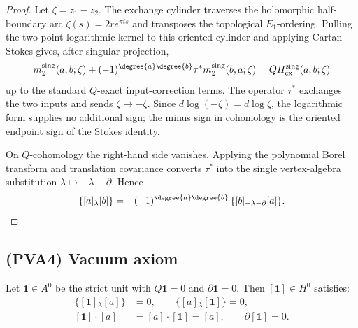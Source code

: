 \begin{proof}
Let \(\zeta=z_1-z_2\).  The exchange cylinder traverses the
holomorphic half-boundary arc \(\zeta(s)=2r e^{\pi i s}\) and
transposes the topological \(E_1\)-ordering.  Pulling the two-point
logarithmic kernel to this oriented cylinder and applying Cartan--Stokes
gives, after singular projection,
\[
m_2^{\mathrm{sing}}(a,b;\zeta)
+(-1)^{\degree{a}\degree{b}}\tau^\ast
m_2^{\mathrm{sing}}(b,a;\zeta)
=QH_{\mathrm{ex}}^{\mathrm{sing}}(a,b;\zeta)
\]
up to the standard \(Q\)-exact input-correction terms.  The operator
\(\tau^\ast\) exchanges the two inputs and sends \(\zeta\mapsto-\zeta\).
Since \(d\log(-\zeta)=d\log\zeta\), the logarithmic form supplies no
additional sign; the minus sign in cohomology is the oriented endpoint
sign of the Stokes identity.

On \(Q\)-cohomology the right-hand side vanishes.  Applying the
polynomial Borel transform and translation covariance converts
\(\tau^\ast\) into the single vertex-algebra substitution
\(\lambda\mapsto-\lambda-\partial\).  Hence
\[
\{[a]{}_\lambda [b]\}
=-(-1)^{\degree{a}\degree{b}}\,
\{[b]{}_{-\lambda-\partial}[a]\}.
\]
\end{proof}

\subsection{(PVA4) Vacuum axiom}

\begin{proposition}[Vacuum]
\label{prop:app-vacuum}
Let $\mathbf{1}\in A^0$ be the strict unit with $Q\mathbf{1} = 0$ and $\partial\mathbf{1} = 0$. Then $[\mathbf{1}]\in H^0$ satisfies:
\begin{align}
\label{eq:app-vac-bracket}
\{[\mathbf{1}]{}_\lambda [a]\} &= 0,
\qquad
\{[a]{}_\lambda[\mathbf{1}]\}=0,\\[3pt]
\label{eq:app-vac-product}
[\mathbf{1}]\cdot [a] &= [a]\cdot[\mathbf{1}]=[a],
\qquad
\partial[\mathbf 1]=0.
\end{align}
\end{proposition}

